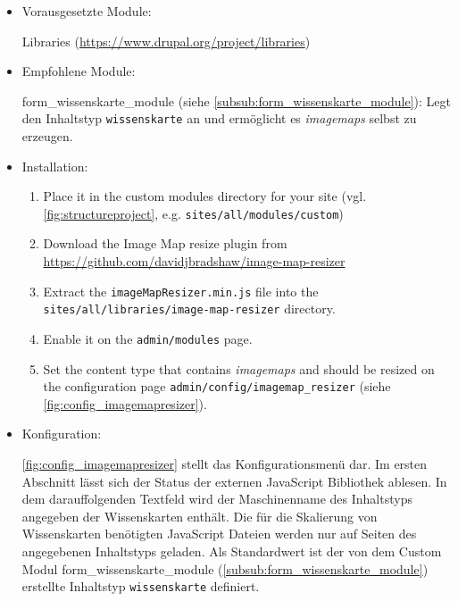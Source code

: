 \begin{itemize}[parsep=0pt, itemsep=5.0pt plus 2.0pt minus 1.0pt, leftmargin=*]
	\item Vorausgesetzte Module:
	
	Libraries (\url{https://www.drupal.org/project/libraries})
	
	
	\item Empfohlene Module: 
	
	form\_wissenskarte\_module (siehe \cref{subsub:form_wissenskarte_module}): Legt den Inhaltstyp \lstinline|wissenskarte| an und ermöglicht es \textit{\glspl{imagemap}} selbst zu erzeugen.	
	
	\item Installation:
	\begin{enumerate}
		\item Place it in the custom modules directory for your site (vgl. \cref{fig:structureproject}, e.g. \lstinline|sites/all/modules/custom|)
		\item Download the Image Map resize plugin from \url{https://github.com/davidjbradshaw/image-map-resizer}
		\item Extract the \lstinline|imageMapResizer.min.js| file into the \lstinline|sites/all/libraries/image-map-resizer| directory.
		\item Enable it on the \lstinline|admin/modules| page.
		\item Set the content type that contains \textit{\glspl{imagemap}} and should be resized on the configuration page \lstinline|admin/config/imagemap_resizer| (siehe \cref{fig:config_imagemapresizer}).
	\end{enumerate}
	
	
	\item Konfiguration:
	
	\cref{fig:config_imagemapresizer} stellt das Konfigurationsmenü dar. Im ersten Abschnitt lässt sich der Status der externen JavaScript Bibliothek ablesen. In dem darauffolgenden Textfeld wird der Maschinenname des Inhaltstyps angegeben der Wissenskarten enthält. Die für die Skalierung von Wissenskarten benötigten JavaScript Dateien werden nur auf Seiten des angegebenen Inhaltstyps geladen. Als Standardwert ist der von dem Custom Modul form\_wissenskarte\_module (\cref{subsub:form_wissenskarte_module}) erstellte Inhaltstyp \lstinline|wissenskarte| definiert.
	
\end{itemize}



\newpage
